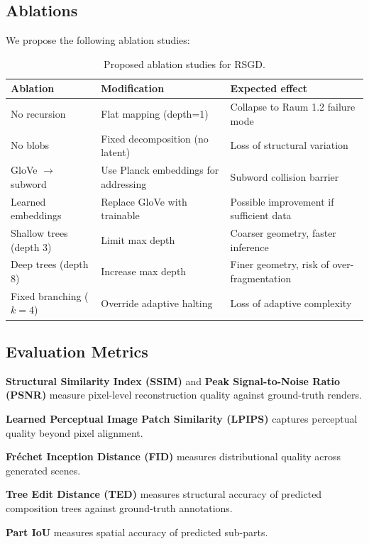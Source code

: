 \documentclass[11pt]{article}
\begin{document}
\subsection{Ablations}

We propose the following ablation studies:

\begin{table}[ht]
\centering
\begin{tabular}{@{}lll@{}}
\toprule
Ablation & Modification & Expected effect \\
\midrule
No recursion & Flat mapping (depth=1) & Collapse to Raum 1.2 failure mode \\
No blobs & Fixed decomposition (no latent) & Loss of structural variation \\
GloVe $\to$ subword & Use Planck embeddings for addressing & Subword collision barrier \\
Learned embeddings & Replace GloVe with trainable & Possible improvement if sufficient data \\
Shallow trees (depth 3) & Limit max depth & Coarser geometry, faster inference \\
Deep trees (depth 8) & Increase max depth & Finer geometry, risk of over-fragmentation \\
Fixed branching ($k{=}4$) & Override adaptive halting & Loss of adaptive complexity \\
\bottomrule
\end{tabular}
\caption{Proposed ablation studies for RSGD.}
\label{tab:ablations}
\end{table}

\subsection{Evaluation Metrics}

\textbf{Structural Similarity Index (SSIM)} and \textbf{Peak Signal-to-Noise Ratio (PSNR)} measure pixel-level reconstruction quality against ground-truth renders.

\textbf{Learned Perceptual Image Patch Similarity (LPIPS)} \cite{zhang2018lpips} captures perceptual quality beyond pixel alignment.

\textbf{Fr\'{e}chet Inception Distance (FID)} \cite{heusel2017} measures distributional quality across generated scenes.

\textbf{Tree Edit Distance (TED)} measures structural accuracy of predicted composition trees against ground-truth annotations.

\textbf{Part IoU} measures spatial accuracy of predicted sub-parts.
\end{document}

